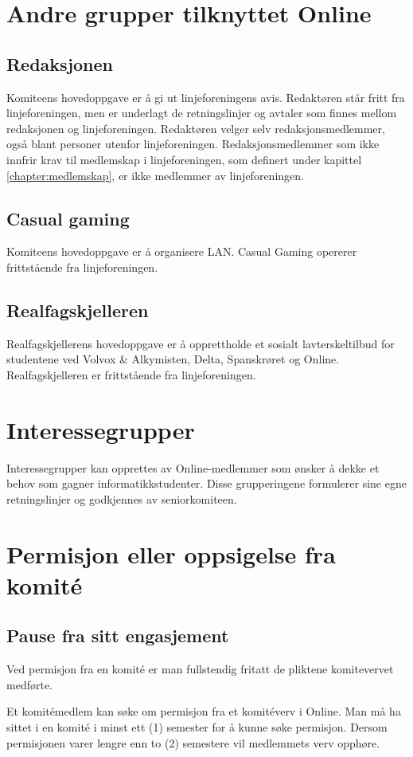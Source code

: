 \section{Andre grupper tilknyttet Online}
\vspace{18pt}

\subsection{Redaksjonen}{
Komiteens hovedoppgave er å gi ut linjeforeningens avis. Redaktøren står fritt fra linjeforeningen, men er underlagt de retningslinjer og avtaler som finnes mellom redaksjonen og linjeforeningen. Redaktøren velger selv redaksjonsmedlemmer, også blant personer utenfor linjeforeningen. Redaksjonsmedlemmer som ikke innfrir krav til medlemskap i linjeforeningen, som definert under kapittel \ref{chapter:medlemskap}, er ikke medlemmer av linjeforeningen.
}

\subsection{Casual gaming}{
Komiteens hovedoppgave er å organisere LAN. Casual Gaming opererer frittstående fra linjeforeningen.
}

\subsection{Realfagskjelleren}{
Realfagskjellerens hovedoppgave er å opprettholde et sosialt lavterskeltilbud for studentene ved Volvox \& Alkymisten, Delta, Spanskrøret og Online. Realfagskjelleren er frittstående fra linjeforeningen.
}


\section{Interessegrupper}
\vspace{23pt}
Interessegrupper kan opprettes av Online-medlemmer som ønsker å dekke et behov som gagner informatikkstudenter. Disse grupperingene formulerer sine egne retningslinjer og godkjennes av seniorkomiteen.

\section{Permisjon eller oppsigelse fra komité}
\vspace{23pt}

\subsection{Pause fra sitt engasjement}{
Ved permisjon fra en komité er man fullstendig fritatt de pliktene komitevervet medførte.

Et komitémedlem kan søke om permisjon fra et komitéverv i Online. Man må ha sittet i en komité i minst ett (1) semester for å kunne søke permisjon. Dersom permisjonen varer lengre enn to (2) semestere vil medlemmets verv opphøre.
}

